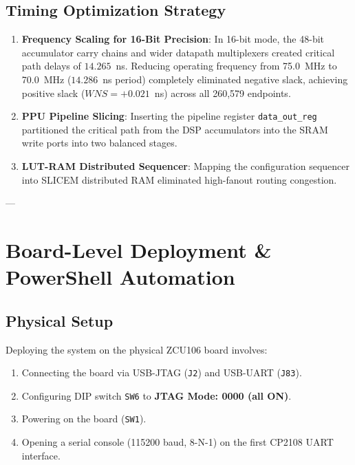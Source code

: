 \documentclass[10pt,journal,compsoc]{IEEEtran}
\begin{document}
\subsection{Timing Optimization Strategy}
\begin{enumerate}
    \item \textbf{Frequency Scaling for 16-Bit Precision}: In 16-bit mode, the 48-bit accumulator carry chains and wider datapath multiplexers created critical path delays of $14.265$~ns. Reducing operating frequency from 75.0~MHz to 70.0~MHz ($14.286$~ns period) completely eliminated negative slack, achieving positive slack ($WNS = +0.021$~ns) across all 260,579 endpoints.
    \item \textbf{PPU Pipeline Slicing}: Inserting the pipeline register \texttt{data\_out\_reg} partitioned the critical path from the DSP accumulators into the SRAM write ports into two balanced stages.
    \item \textbf{LUT-RAM Distributed Sequencer}: Mapping the configuration sequencer into SLICEM distributed RAM eliminated high-fanout routing congestion.
\end{enumerate}

---

\section{Board-Level Deployment \& PowerShell Automation}

\subsection{Physical Setup}
Deploying the system on the physical ZCU106 board involves:
\begin{enumerate}
    \item Connecting the board via USB-JTAG (\texttt{J2}) and USB-UART (\texttt{J83}).
    \item Configuring DIP switch \texttt{SW6} to \textbf{JTAG Mode: 0000 (all ON)}.
    \item Powering on the board (\texttt{SW1}).
    \item Opening a serial console (115200 baud, 8-N-1) on the first CP2108 UART interface.
\end{enumerate}
\end{document}
